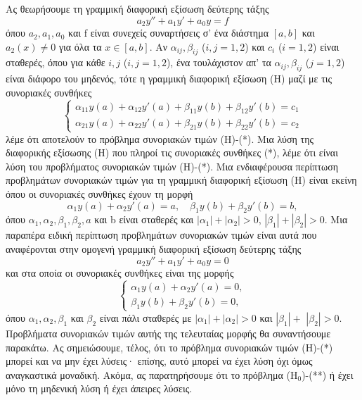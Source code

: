 \documentclass[11pt,a4paper,twoside]{book}
\begin{document}
Ας θεωρήσουμε τη γραμμική διαφορική εξίσωση δεύτερης τάξης
\begin{equation}
    a_2 y'' + a_1 y' + a_0 y = f \tag{H}
\end{equation}
όπου $a_2,a_1,a_0$ και f είναι συνεχείς συναρτήσεις σ' ένα διάστημα $[a,b]$ και $a_2(x) \neq 0$ για όλα τα $x\in [a,b]$. Αν $\alpha_{ij}, \beta_{ij}$ ($i,j=1,2$) και $c_i$ ($i=1,2$) είναι σταθερές, όπου για κάθε $i,j$ ($i,j=1,2$), ένα τουλάχιστον απ' τα $\alpha_{ij}, \beta_{ij}$ ($j=1,2$) είναι διάφορο του μηδενός, τότε η γραμμική διαφορική εξίσωση (Η) μαζί με τις συνοριακές συνθήκες
\begin{equation}
\begin{cases}
    \alpha_{11} y(a) + \alpha_{12} y'(a) + \beta_{11} y(b) + \beta_{12} y'(b) = c_1 \\
    \alpha_{21} y(a) + \alpha_{22} y'(a) + \beta_{21} y(b) + \beta_{22} y'(b) = c_2
\end{cases}
\tag{*}
\end{equation}
λέμε ότι αποτελούν το πρόβλημα συνοριακών τιμών (Η)-(*). Μια λύση της διαφορικής εξίσωσης (Η) που πληροί τις συνοριακές συνθήκες (*), λέμε ότι είναι λύση του προβλήματος συνοριακών τιμών (Η)-(*). Μια ενδιαφέρουσα περίπτωση προβλημάτων συνοριακών τιμών για τη γραμμική διαφορική εξίσωση (Η) είναι εκείνη όπου οι συνοριακές συνθήκες έχουν τη μορφή
\[ \alpha_1 y(a) + \alpha_2 y'(a) = a, \quad \beta_1 y(b) + \beta_2 y'(b) = b, \]
όπου $\alpha_1, \alpha_2, \beta_1, \beta_2, a$ και b είναι σταθερές και $|\alpha_1|+|\alpha_2|>0$, $|\beta_1|+|\beta_2|>0$. Μια παραπέρα ειδική περίπτωση προβλημάτων συνοριακών τιμών είναι αυτά που αναφέρονται στην ομογενή γραμμική διαφορική εξίσωση δεύτερης τάξης
\begin{equation}
    a_2 y'' + a_1 y' + a_0 y = 0 \tag{H$_0$}
\end{equation}
και στα οποία οι συνοριακές συνθήκες είναι της μορφής
\begin{equation}
\begin{cases}
    \alpha_1 y(a) + \alpha_2 y'(a) = 0, \\
    \beta_1 y(b) + \beta_2 y'(b) = 0,
\end{cases}
\tag{**}
\end{equation}
όπου $\alpha_1, \alpha_2, \beta_1$ και $\beta_2$ είναι πάλι σταθερές με $|\alpha_1|+|\alpha_2|>0$ και $|\beta_1|+$
$|\beta_2|>0$. Προβλήματα συνοριακών τιμών αυτής της τελευταίας μορφής θα συναντήσουμε παρακάτω. Ας σημειώσουμε, τέλος, ότι το πρόβλημα συνοριακών τιμών (Η)-(*) μπορεί και να μην έχει λύσεις· επίσης, αυτό μπορεί να έχει λύση όχι όμως αναγκαστικά μοναδική. Ακόμα, ας παρατηρήσουμε ότι το πρόβλημα (Η$_0$)-(**) ή έχει μόνο τη μηδενική λύση ή έχει άπειρες λύσεις.
\end{document}
